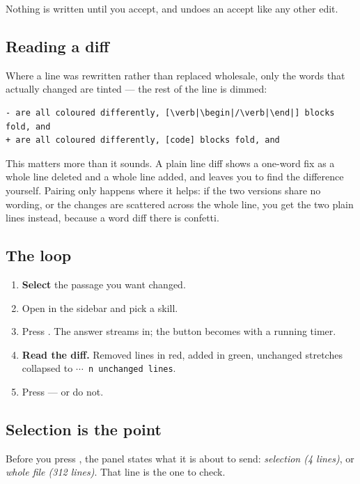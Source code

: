 Nothing is written until you accept, and  undoes an accept like any
other edit.

\subsection{Reading a diff}

Where a line was rewritten rather than replaced wholesale, only the words that
actually changed are tinted --- the rest of the line is dimmed:

\begin{lstlisting}
- are all coloured differently, [\verb|\begin|/\verb|\end|] blocks fold, and
+ are all coloured differently, [code] blocks fold, and
\end{lstlisting}

This matters more than it sounds. A plain line diff shows a one-word fix as a
whole line deleted and a whole line added, and leaves you to find the
difference yourself. Pairing only happens where it helps: if the two versions
share no wording, or the changes are scattered across the whole line, you get
the two plain lines instead, because a word diff there is confetti.

\subsection{The loop}

\begin{enumerate}[leftmargin=*]
  \item \textbf{Select} the passage you want changed.
  \item Open  in the sidebar and pick a skill.
  \item Press . The answer streams in; the button becomes
         with a running timer.
  \item \textbf{Read the diff.} Removed lines in red, added in green,
        unchanged stretches collapsed to \texttt{$\cdots$ n unchanged lines}.
  \item Press  --- or do not.
\end{enumerate}

\subsection{Selection is the point}

Before you press , the panel states what it is about to send:
\emph{selection (4 lines)}, or \emph{whole file (312 lines)}. That line is the
one to check.

